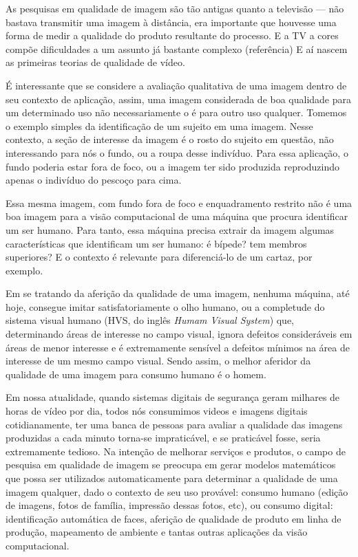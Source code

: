 \documentclass[a4paper]{book}
\begin{document}
	As pesquisas em qualidade de imagem são tão antigas quanto a televisão --- não bastava transmitir uma imagem à distância, era importante que houvesse uma forma de medir a qualidade do produto resultante do processo. E a TV a cores compõe dificuldades a um assunto já bastante complexo (referência)
	E aí nascem as primeiras teorias de qualidade de vídeo.

	É interessante que se considere a avaliação qualitativa de uma imagem dentro de seu contexto de aplicação, assim, uma imagem considerada de boa qualidade para um determinado uso não necessariamente o é para outro uso qualquer. Tomemos o exemplo simples da identificação de um sujeito em uma imagem. Nesse contexto, a seção de interesse da imagem é o rosto do sujeito em questão, não interessando para nós o fundo, ou a roupa desse indivíduo. Para essa aplicação, o fundo poderia estar fora de foco, ou a imagem ter sido produzida reproduzindo apenas o indivíduo do pescoço para cima.

	Essa mesma imagem, com fundo fora de foco e enquadramento restrito não é uma boa imagem para a visão computacional de uma máquina que procura identificar um ser humano. Para tanto, essa máquina precisa extrair da imagem algumas características que identificam um ser humano: é bípede? tem membros superiores? E o contexto é relevante para diferenciá-lo de um cartaz, por exemplo.

	Em se tratando da aferição da qualidade de uma imagem, nenhuma máquina, até hoje, consegue imitar satisfatoriamente o olho humano, ou a completude do sistema visual humano (HVS, do inglês {\em Humam Visual System}) que, determinando áreas de interesse no campo visual, ignora defeitos consideráveis em áreas de menor interesse e é extremamente sensível a defeitos mínimos na área de interesse de um mesmo campo visual. Sendo assim, o melhor aferidor da qualidade de uma imagem para consumo humano é o homem.

	Em nossa atualidade, quando sistemas digitais de segurança geram milhares de horas de vídeo por dia, todos nós consumimos videos e imagens digitais cotidianamente, ter uma banca de pessoas para avaliar a qualidade das imagens produzidas a cada minuto torna-se impraticável, e se praticável fosse, seria extremamente tedioso. Na intenção de melhorar serviços e produtos, o campo de pesquisa em qualidade de imagem se preocupa em gerar modelos matemáticos que possa ser utilizados automaticamente para determinar a qualidade de uma imagem qualquer, dado o contexto de seu uso provável: consumo humano (edição de imagens, fotos de família, impressão dessas fotos, etc), ou consumo digital: identificação automática de faces, aferição de qualidade de produto em linha de produção, mapeamento de ambiente e tantas outras aplicações da visão computacional.
\end{document}
